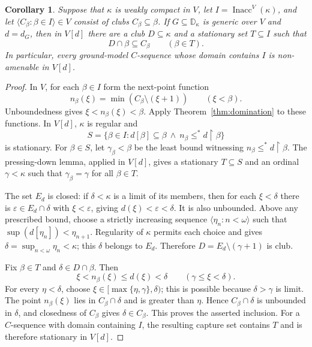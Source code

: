 \documentclass[11pt,a4paper]{amsart}
\newtheorem{corollary}[theorem]{Corollary}
\theoremstyle{definition}
\theoremstyle{remark}
\newcommand{\D}{\mathbb D}
\DeclareMathOperator{\Inacc}{Inacc}
\begin{document}
\begin{corollary}\label{cor:capture}
Suppose that \(\kappa\) is weakly compact in \(V\), let
\(I=\Inacc^V(\kappa)\), and let
\(\langle C_\beta:\beta\in I\rangle\in V\) consist of clubs
\(C_\beta\subseteq\beta\). If \(G\subseteq\D_\kappa\) is
generic over \(V\) and \(d=d_G\), then in \(V[d]\) there are
a club \(D\subseteq\kappa\) and a stationary set
\(T\subseteq I\) such that
\[
 D\cap\beta\subseteq C_\beta\qquad(\beta\in T).
\]
In particular, every ground-model \(C\)-sequence whose domain
contains \(I\) is non-amenable in \(V[d]\).
\end{corollary}
\begin{proof}
In \(V\), for each \(\beta\in I\) form the next-point function
\[
 n_\beta(\xi)=\min(C_\beta\setminus(\xi+1))
                              \qquad(\xi<\beta).
\]
Unboundedness gives \(\xi<n_\beta(\xi)<\beta\). Apply
Theorem~\ref{thm:domination} to these functions. In \(V[d]\),
\(\kappa\) is regular and
\[
 S=\{\beta\in I:d[\beta]\subseteq\beta
                  \ \land\ n_\beta\leq^*d\restriction\beta\}
\]
is stationary. For \(\beta\in S\), let
\(\gamma_\beta<\beta\) be the least bound witnessing
\(n_\beta\leq^*d\restriction\beta\). The pressing-down lemma, applied
in \(V[d]\), gives a stationary \(T\subseteq S\) and an
ordinal \(\gamma<\kappa\) such that
\(\gamma_\beta=\gamma\) for all \(\beta\in T\).

The set \(E_d\) is closed: if \(\delta<\kappa\) is a limit
of its members, then for each \(\xi<\delta\) there is
\(\varepsilon\in E_d\cap\delta\) with \(\xi<\varepsilon\),
giving \(d(\xi)<\varepsilon<\delta\). It is also unbounded.
Above any prescribed bound, choose a strictly increasing sequence
\(\langle\eta_n:n<\omega\rangle\) such that
\(\sup(d[\eta_n])<\eta_{n+1}\). Regularity of \(\kappa\)
permits each choice and gives
\(\delta=\sup_{n<\omega}\eta_n<\kappa\); this \(\delta\)
belongs to \(E_d\). Therefore
\(D=E_d\setminus(\gamma+1)\) is club.

Fix \(\beta\in T\) and \(\delta\in D\cap\beta\). Then
\[
 \xi<n_\beta(\xi)\leq d(\xi)<\delta
                     \qquad(\gamma\leq\xi<\delta).
\]
For every \(\eta<\delta\), choose
\(\xi\in[\max\{\eta,\gamma\},\delta)\); this is possible
because \(\delta>\gamma\) is limit. The point
\(n_\beta(\xi)\) lies in \(C_\beta\cap\delta\) and is
greater than \(\eta\). Hence \(C_\beta\cap\delta\) is
unbounded in \(\delta\), and closedness of \(C_\beta\) gives
\(\delta\in C_\beta\). This proves the asserted inclusion.
For a \(C\)-sequence with domain containing \(I\), the resulting
capture set contains \(T\) and is therefore stationary in
\(V[d]\).
\end{proof}
\end{document}
